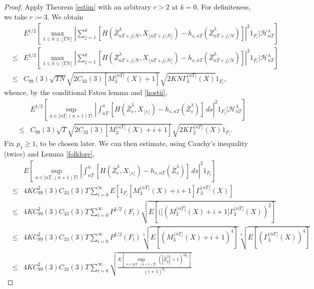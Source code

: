 \documentclass[a4paper,draft]{article}
\begin{document}
\begin{proof}
Apply Theorem \ref{estim} with an arbitrary $r>2$ at $k=0$. For definiteness, we take $r:=3$. We obtain
\begin{eqnarray*}
& & E^{1/2}\left[\max_{1\leq k\leq \lfloor TN\rfloor}\left\vert\sum_{j=1}^k
[H(\overline{Z}^{\lambda}_{nT+j/N},X_{\lfloor nT+j/N\rfloor})-h_{s,nT}(\overline{Z}^{\lambda}_{nT+j/N})]
\right\vert^{2} 1_{F_i} \vert \mathcal{H}_{nT}^{\lambda}\right]\\ &\leq&
E^{1/3}\left[\max_{1\leq k\leq \lfloor TN\rfloor}\left\vert\sum_{j=1}^k
[H(\overline{Z}^{\lambda}_{nT+j/N},X_{\lfloor nT+j/N\rfloor})-h_{s,nT}(\overline{Z}^{\lambda}_{nT+j/N})]
\right\vert^{3} 1_{F_i} \vert \mathcal{H}_{nT}^{\lambda}\right]\\ &\leq&
C_{99}(3)\sqrt{TN}\sqrt{2C_{33}(3)[M^{\lfloor nT\rfloor}_{3}(X)+1]}
\sqrt{2KN\Gamma^{\lfloor nT\rfloor}_{3}(X)}1_{F_i},
\end{eqnarray*}
whence, by the conditional Fatou lemma and \eqref{hostii},
\begin{eqnarray*}
& & E^{1/2}\left[\sup_{u\in [nT,(n+1)T)}\left\vert\int_{nT}^u
[H(\overline{Z}^{\lambda}_s,X_{\lfloor s\rfloor})-h_{s,nT}(\overline{Z}^{\lambda}_s)]
\, ds\right\vert^{2}1_{F_i}\vert\mathcal{H}_{nT}^{\lambda}\right]\\ &\leq&
C_{99}(3)\sqrt{T}\sqrt{2{C}_{33}(3)[M^{\lfloor nT\rfloor}_{3}(X)+i+1]}\sqrt{2K\Gamma^{\lfloor nT\rfloor}_{3}(X)}1_{F_i}.
\end{eqnarray*} Fix $p_1\geq 1$, to be chosen later.
We can then estimate, using Cauchy's inequality (twice) and Lemma \ref{folklore},
\begin{eqnarray*}
& & E\left[\sup_{u\in [nT,(n+1)T)}\left\vert\int_{nT}^u
[H(\overline{Z}^{\lambda}_s,X_{\lfloor s\rfloor})-h_{s,nT}(\overline{Z}^{\lambda}_s)]
\, ds\right\vert^{2}1_{F_i}\right]\\ &\leq&
4KC_{99}^2(3)C_{33}(3){T}\sum_{i=0}^{\infty}E\left[1_{F_i}
[M^{\lfloor nT\rfloor}_{3}(X)+i+1]\Gamma^{\lfloor nT\rfloor}_{3}(X)
\right]\\
&\leq& 4KC^2_{99}(3)C_{33}(3)T\sum_{i=0}^{\infty}P^{1/2}(F_i)
\sqrt{E\left[([(M^{\lfloor nT\rfloor}_{3}(X)+i+1]\Gamma^{\lfloor nT\rfloor}_{3}(X))^2\right]}\\
&\leq& 4KC^2_{99}(3) C_{33}(3)T\sum_{i=0}^{\infty}P^{1/2}(F_i)
\sqrt[4]{E[(M^{\lfloor nT\rfloor}_{3}(X)+i+1)^4]}\sqrt[4]{E[(\Gamma^{\lfloor nT\rfloor}_{3}(X))^4]}\\
&\leq& 4KC^2_{99}(3)C_{33}(3){T}\sum_{i=0}^{\infty}
\sqrt{\frac{E\left[\sup_{s\in [nT,(n+1)T)}(|\overline{Z}^{\lambda}_{y}|+1)^{2p_1}\right]}{(i+1)^{p_1}}}

\end{eqnarray*}
\end{proof}
\end{document}
